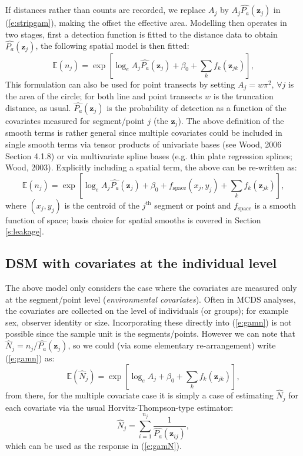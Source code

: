\documentclass[useAMS,referee]{biom}
\begin{document}
If distances rather than counts are recorded, we replace $A_j$ by $A_j\hat{P_a}(\mathbf{z}_j)$ in (\ref{e:stripgam}), making the offset the effective area. Modelling then operates in two stages, first a detection function is fitted to the distance data to obtain $\hat{P_a}(\mathbf{z}_j)$, the following spatial model is then fitted:
\begin{equation}
\mathbb{E}(n_j) = \exp\left[ \log_e A_j\hat{P_a}(\mathbf{z}_j) + \beta_0 + \sum_k f_k\left(\bm{z}_{jk}\right) \right],
\label{e:gamn}
\end{equation}
This formulation can also be used for point transects by setting $A_j=w\pi^2$, $\forall j$ is the area of the circle; for both line and point transects $w$ is the truncation distance, as usual. $\hat{P_a}(\mathbf{z}_j)$ is the probability of detection as a function of the covariates measured for segment/point $j$ (the $\mathbf{z}_j$). The above definition of the smooth terms is rather general since multiple covariates could be included in single smooth terms via tensor products of univariate bases (see Wood, 2006 Section 4.1.8) or via multivariate spline bases (e.g. thin plate regression splines; Wood, 2003). Explicitly including a spatial term, the above can be re-written as:
\begin{equation*}
\mathbb{E}(n_j) = \exp\left[ \log_e A_j \hat{P_a}(\mathbf{z}_j) + \beta_0 + f_\text{space}\left(x_j,y_j\right) + \sum_k f_k \left(\bm{z}_{jk}\right) \right],
\end{equation*}
where $(x_j,y_j)$ is the centroid of the $j^\text{th}$ segment or point and $f_\text{space}$ is a smooth function of space; basis choice for spatial smooths is covered in Section \ref{s:leakage}.

\subsection{DSM with covariates at the individual level}

The above model only considers the case where the covariates are measured only at the segment/point level (\textit{environmental covariates}). Often in MCDS analyses, the covariates are collected on the level of individuals (or groups); for example sex, observer identity or size. Incorporating these directly into (\ref{e:gamn}) is not possible since the sample unit is the segments/points. However we can note that $\hat{N}_j = n_j/\hat{P_a}(\mathbf{z}_j)$, so we could (via some elementary re-arrangement) write (\ref{e:gamn}) as:
\begin{equation}
\mathbb{E}(\hat{N}_j) = \exp\left[ \log_e A_j + \beta_0 + \sum_k f_k\left(\bm{z}_{jk}\right) \right],
\label{e:gamN}
\end{equation}
from there, for the multiple covariate case it is simply a case of estimating $\hat{N}_j$ for each covariate via the usual Horvitz-Thompson-type estimator:
\begin{equation*}
\hat{N}_j = \sum_{i=1}^{n_j} \frac{1}{\hat{P_a}(\mathbf{z}_{ij})},
\end{equation*}
which can be used as the response in (\ref{e:gamN}). 
\end{document}
